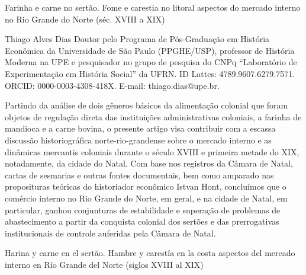 \begin{refsection}
\renewcommand{\thefigure}{\arabic{figure}}

\chapterTwoLines
{Farinha e carne no sertão. Fome e carestia no litoral}
{aspectos do mercado interno no Rio Grande do Norte (séc. XVIII a XIX)}
\label{chap:farinha}

\articleAuthor
{Thiago Alves Dias}
{Doutor pelo Programa de Pós-Graduação em História Econômica da Universidade de São Paulo (PPGHE/USP), professor de História Moderna na UPE e pesquisador no grupo de pesquisa do CNPq ``Laboratório de Experimentação em História Social'' da UFRN. ID Lattes: 4789.9607.6279.7571. ORCID: 0000-0003-4308-418X. E-mail: thiago.dias@upe.br.}

\begin{galoResumo}
    Partindo da análise de dois gêneros básicos da alimentação colonial que foram objetos de regulação direta das instituições administrativas coloniais, a farinha de mandioca e a carne bovina, o presente artigo visa contribuir com a escassa discussão historiográfica norte-rio-grandense sobre o mercado interno e as dinâmicas mercantis coloniais durante o século XVIII e primeira metade do XIX, notadamente, da cidade do Natal. Com base nos registros da Câmara de Natal, cartas de sesmarias e outras fontes documentais, bem como amparado nas proposituras teóricas do historiador econômico Istvan Hont, concluímos que o comércio interno no Rio Grande do Norte, em geral, e na cidade de Natal, em particular, ganhou conjunturas de estabilidade e superação de problemas de abastecimento a partir da conquista colonial dos sertões e das prerrogativas institucionais de controle auferidas pela Câmara de Natal.
\end{galoResumo}


\begin{otherlanguage}{spanish}

    \fakeChapterTwoLines
    {Harina y carne en el sertão. Hambre y carestía en la costa}
    {aspectos del mercado interno en Río Grande del Norte (siglos XVIII al XIX)}
    

\end{otherlanguage}
\end{refsection}
